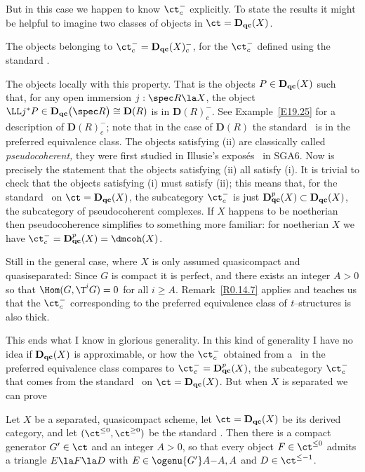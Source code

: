 \documentclass[11pt]{amsart}
\newcommand{\D}{{\mathbf D}}
\newcommand{\Dqc}{{\mathbf D_{\text{\bf qc}}}}
\newcommand{\Dqcp}{{\mathbf D_{\text{\bf qc}}^p}}
\begin{document}
But in this case we happen to know $\ct^-_c$  explicitly.
To state the results it might be helpful to imagine
two classes of objects in $\ct=\Dqc(X)$.
\be
\item
  The objects belonging to $\ct^-_c=\Dqc(X)^-_c$, for
  the $\ct^-_c$ defined
  using the standard \tstr.
\item
  The objects locally with this property. That is the objects
  $P\in\Dqc(X)$
  such that, for any open immersion $j:\spec R\la X$, the
  object $\LL j^*P\in\Dqc\big(\spec R\big)\cong\D(R)$ is
  in $\D(R)^-_c$. See Example~\ref{E19.25} for a
  description of $\D(R)^-_c$; note that in the case of
  $\D(R)$ the standard \tstr\ is in the preferred equivalence class.
\ee
The objects satisfying (ii) are classically
called \emph{pseudocoherent,} they were first studied
in Illusie's expos\'es~\cite{Illusie71B,Illusie71A} in SGA6.
Now
\cite[Theorem~4.1]{Lipman-Neeman07} is precisely the statement
that the objects satisfying (ii) all satisfy (i).
It is trivial to check that the objects satisfying (i)
must satisfy (ii); this means that, for the
standard \tstr\ on $\ct=\Dqc(X)$,
the subcategory $\ct^-_c$ is just
$\Dqcp(X)\subset\Dqc(X)$,
the subcategory of pseudocoherent complexes.
If $X$ happens to be noetherian then pseudocoherence
simplifies to something more familiar: for noetherian $X$
we have $\ct^-_c=\Dqcp(X)=\dmcoh(X)$.


Still in the general case, where $X$ is
only assumed quasicompact and quasiseparated:
Since $G$ is compact it is perfect, and there exists an integer $A>0$ so that
$\Hom(G,\T^iG)=0$ for all $i\geq A$.  Remark~\ref{R0.14.7}
applies and teaches us that the $\ct^-_c$ corresponding
to the preferred equivalence class of {\it t}--structures
is also thick.

This ends what I know in glorious generality. In this
kind of generality I have no idea if
$\Dqc(X)$ is approximable, or how the $\ct^-_c$ obtained from
a \tstr\ in the preferred equivalence class compares
to $\ct^-_c=\Dqcp(X)$, the subcategory $\ct^-_c$ that comes
from the standard \tstr\ on $\ct=\Dqc(X)$. But when $X$ is separated we
can prove
\eexm


Let $X$ be a separated, quasicompact scheme, let $\ct=\Dqc(X)$ be
its derived category, and let $(\ct^{\leq0},\ct^{\geq0})$ be the
standard \tstr. Then there is a compact generator $G'\in\ct$ and
an integer $A>0$, so that every object $F\in\ct^{\leq0}$ admits
a triangle $E\la F\la D$ with $E\in\ogenu {G'}A{-A,A}$ and $D\in\ct^{\leq-1}$.
\elem
\end{document}
